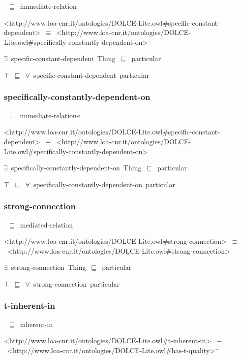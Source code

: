 \documentclass{article}
\begin{document}
~\ensuremath{\sqsubseteq}~immediate-relation

<http://www.loa-cnr.it/ontologies/DOLCE-Lite.owl#specific-constant-dependent>~\ensuremath{\equiv}~<http://www.loa-cnr.it/ontologies/DOLCE-Lite.owl#specifically-constantly-dependent-on>\ensuremath{^-}

\ensuremath{\exists}~specific-constant-dependent~Thing~\ensuremath{\sqsubseteq}~particular

\ensuremath{\top}~\ensuremath{\sqsubseteq}~\ensuremath{\forall}~specific-constant-dependent~particular

\subsubsection*{specifically-constantly-dependent-on}

~\ensuremath{\sqsubseteq}~immediate-relation-i

<http://www.loa-cnr.it/ontologies/DOLCE-Lite.owl#specific-constant-dependent>~\ensuremath{\equiv}~<http://www.loa-cnr.it/ontologies/DOLCE-Lite.owl#specifically-constantly-dependent-on>\ensuremath{^-}

\ensuremath{\exists}~specifically-constantly-dependent-on~Thing~\ensuremath{\sqsubseteq}~particular

\ensuremath{\top}~\ensuremath{\sqsubseteq}~\ensuremath{\forall}~specifically-constantly-dependent-on~particular

\subsubsection*{strong-connection}

~\ensuremath{\sqsubseteq}~mediated-relation

<http://www.loa-cnr.it/ontologies/DOLCE-Lite.owl#strong-connection>~\ensuremath{\equiv}~<http://www.loa-cnr.it/ontologies/DOLCE-Lite.owl#strong-connection>\ensuremath{^-}

\ensuremath{\exists}~strong-connection~Thing~\ensuremath{\sqsubseteq}~particular

\ensuremath{\top}~\ensuremath{\sqsubseteq}~\ensuremath{\forall}~strong-connection~particular

\subsubsection*{t-inherent-in}

~\ensuremath{\sqsubseteq}~inherent-in

<http://www.loa-cnr.it/ontologies/DOLCE-Lite.owl#t-inherent-in>~\ensuremath{\equiv}~<http://www.loa-cnr.it/ontologies/DOLCE-Lite.owl#has-t-quality>\ensuremath{^-}
\end{document}
